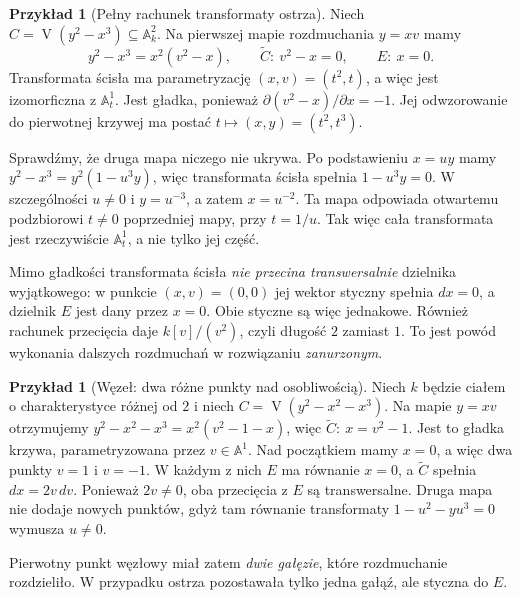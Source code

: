 \documentclass[11pt,a4paper,openany]{report}
\numberwithin{equation}{section}
\theoremstyle{plain}
\theoremstyle{definition}
\newtheorem{przyklad}[twierdzenie]{Przykład}
\theoremstyle{remark}
\newcommand{\A}{\mathbb A}
\newcommand{\V}{\operatorname V}
\begin{document}
\begin{przyklad}[Pełny rachunek transformaty ostrza]
\label{prz:ga5-cusp}
Niech $C=\V(y^2-x^3)\subseteq\A^2_k$. Na pierwszej
mapie rozdmuchania $y=xv$ mamy
\[
 y^2-x^3=x^2(v^2-x),\qquad
 \widetilde C:\ v^2-x=0,\qquad E:\ x=0.
\]
Transformata ścisła ma parametryzację
$(x,v)=(t^2,t)$, a więc jest izomorficzna z $\A^1_t$.
Jest gładka, ponieważ $\partial(v^2-x)/\partial x=-1$.
Jej odwzorowanie do pierwotnej krzywej ma postać
$t\mapsto(x,y)=(t^2,t^3)$.

Sprawdźmy, że druga mapa niczego nie ukrywa.
Po podstawieniu $x=uy$ mamy
$y^2-x^3=y^2(1-u^3y)$, więc transformata ścisła
spełnia $1-u^3y=0$. W szczególności $u\ne0$ i
$y=u^{-3}$, a zatem $x=u^{-2}$. Ta mapa odpowiada
otwartemu podzbiorowi $t\ne0$ poprzedniej mapy,
przy $t=1/u$. Tak więc cała transformata jest
rzeczywiście $\A^1_t$, a nie tylko jej część.

Mimo gładkości transformata ścisła \emph{nie przecina
transwersalnie} dzielnika wyjątkowego: w punkcie
$(x,v)=(0,0)$ jej wektor styczny spełnia $dx=0$,
a dzielnik $E$ jest dany przez $x=0$. Obie styczne
są więc jednakowe. Również rachunek przecięcia
daje $k[v]/(v^2)$, czyli długość $2$ zamiast $1$.
To jest powód wykonania dalszych rozdmuchań
w rozwiązaniu \emph{zanurzonym}.
\end{przyklad}

\begin{przyklad}[Węzeł: dwa różne punkty nad osobliwością]
\label{prz:ga5-node}
Niech $k$ będzie ciałem o charakterystyce różnej od $2$
i niech $C=\V(y^2-x^2-x^3)$. Na mapie $y=xv$
otrzymujemy
$y^2-x^2-x^3=x^2(v^2-1-x)$, więc
$\widetilde C:\ x=v^2-1$. Jest to gładka krzywa,
parametryzowana przez $v\in\A^1$.
Nad początkiem mamy $x=0$, a więc dwa punkty
$v=1$ i $v=-1$. W każdym z nich $E$ ma równanie
$x=0$, a $\widetilde C$ spełnia $dx=2v\,dv$.
Ponieważ $2v\ne0$, oba przecięcia z $E$ są
transwersalne. Druga mapa nie dodaje nowych punktów,
gdyż tam równanie transformaty
$1-u^2-yu^3=0$ wymusza $u\ne0$.

Pierwotny punkt węzłowy miał zatem \emph{dwie gałęzie},
które rozdmuchanie rozdzieliło. W przypadku ostrza
pozostawała tylko jedna gałąź, ale styczna do $E$.
\end{przyklad}
\end{document}
